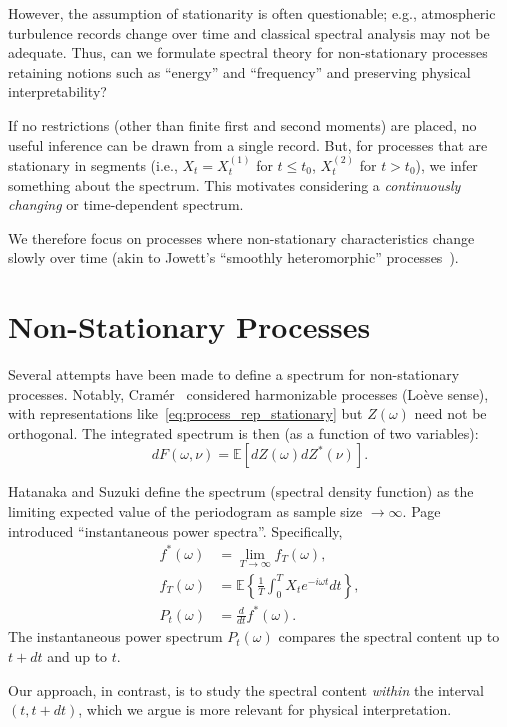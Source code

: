 \documentclass[12pt]{article}
\theoremstyle{definition}
\theoremstyle{plain}
\theoremstyle{remark}
\begin{document}
However, the assumption of stationarity is often questionable; e.g., atmospheric turbulence records change over time and classical spectral analysis may not be adequate. Thus, can we formulate spectral theory for non-stationary processes retaining notions such as ``energy'' and ``frequency'' and preserving physical interpretability?

If no restrictions (other than finite first and second moments) are placed, no useful inference can be drawn from a single record. But, for processes that are stationary in segments (i.e., $X_t = X^{(1)}_t$ for $t \leq t_0$, $X^{(2)}_t$ for $t > t_0$), we infer something about the spectrum. This motivates considering a \emph{continuously changing} or time-dependent spectrum.

We therefore focus on processes where non-stationary characteristics change slowly over time (akin to Jowett's ``smoothly heteromorphic'' processes~\cite{Jowett1957}).

\section{Non-Stationary Processes}
\label{sec:nonstationary}

Several attempts have been made to define a spectrum for non-stationary processes. Notably, Cramér~\cite{Cramer1960} considered harmonizable processes (Loève sense), with representations like~\eqref{eq:process_rep_stationary} but $Z(\omega)$ need not be orthogonal. The integrated spectrum is then (as a function of two variables):
\begin{equation}
dF(\omega, \nu) = \mathbb{E}[dZ(\omega) dZ^*(\nu)].
\end{equation}

Hatanaka and Suzuki define the spectrum (spectral density function) as the limiting expected value of the periodogram as sample size $\to\infty$. Page~\cite{Page1952} introduced ``instantaneous power spectra''. Specifically,
\begin{align}
f^*(\omega) &= \lim_{T \to \infty} f_T(\omega),\\
f_T(\omega) &= \mathbb{E}\left\{ \frac{1}{T} \int_0^T X_t e^{-i \omega t} dt \right\},\\
P_t(\omega) &= \frac{d}{dt}f^*(\omega).
\end{align}
The instantaneous power spectrum $P_t(\omega)$ compares the spectral content up to $t+dt$ and up to $t$.

Our approach, in contrast, is to study the spectral content \emph{within} the interval $(t, t+dt)$, which we argue is more relevant for physical interpretation.
\end{document}
